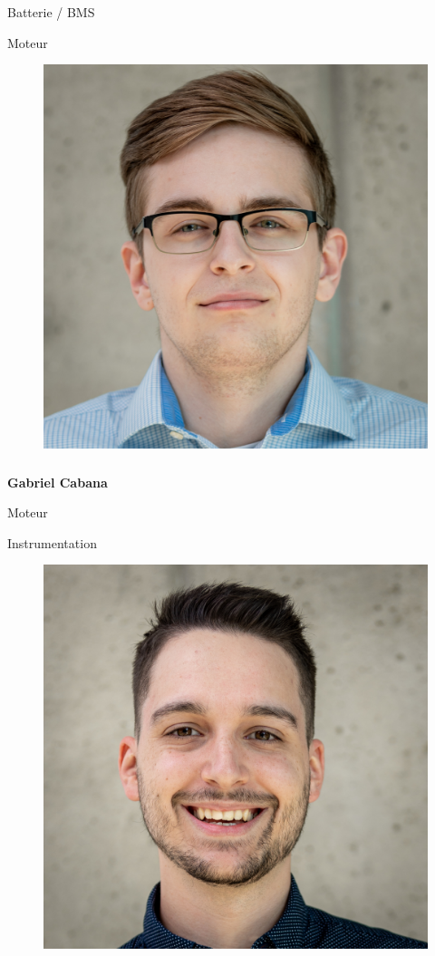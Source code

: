 \documentclass[a0paper,portrait]{baposter}
\begin{document}
\begin{poster}
{Batterie / BMS

Moteur

\begin{figure}
\includegraphics[width=.9\linewidth]{img/membres/Gabriel-Cabana-2.jpg} 
\end{figure}
\subsubsection*{}
\vspace{-2mm}
\textbf{Gabriel Cabana}

Moteur

Instrumentation


\begin{figure}
\includegraphics[width=.9\linewidth]{img/membres/Jérôme-Gelé-2.jpg} 
\end{figure}
}
\end{poster}
\end{document}

